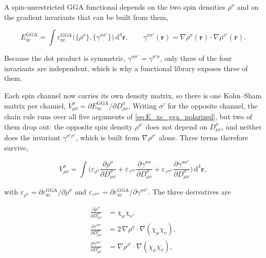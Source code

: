 \documentclass{article}
\begin{document}
A spin-unrestricted GGA functional depends on the two spin densities
\( \rho^\sigma \) and on the gradient invariants that can be built from
them,

\begin{equation}
  E_\text{xc}^\text{GGA} = \int \varepsilon_\text{xc}^\text{GGA}
  \big( \{\rho^\sigma\}, \{\gamma^{\sigma \sigma'}\} \big)\, \mathrm
  d^3 \mathbf r,
  \qquad
  \gamma^{\sigma \sigma'}(\mathbf r) = \nabla\rho^\sigma(\mathbf r)
  \cdot \nabla\rho^{\sigma'}(\mathbf r).
  \label{eq:E_xc_gga_polarized}
\end{equation}

Because the dot product is symmetric, \( \gamma^{\sigma \sigma'} =
\gamma^{\sigma' \sigma} \), only three of the four invariants are
independent, which is why a functional library exposes three of them.

Each spin channel now carries its own density matrix, so there is one
Kohn--Sham matrix per channel,
\( V^{\sigma}_{\mu \nu} = \partial E_\text{xc}^\text{GGA} / \partial
D^{\sigma}_{\mu \nu} \). Writing \( \sigma' \) for the opposite
channel, the chain rule runs over all five arguments of
\eqref{eq:E_xc_gga_polarized}, but two of them drop out: the opposite
spin density \( \rho^{\sigma'} \) does not depend on
\( D^{\sigma}_{\mu \nu} \), and neither does the invariant
\( \gamma^{\sigma' \sigma'} \), which is built from
\( \nabla \rho^{\sigma'} \) alone. Three terms therefore survive,

\begin{equation}
  V^{\sigma}_{\mu \nu} = \int \bigg(
    \varepsilon_{\rho^\sigma}
    \frac{\partial \rho^\sigma}{\partial D^{\sigma}_{\mu \nu}}
    + \varepsilon_{\gamma^{\sigma \sigma}}
    \frac{\partial \gamma^{\sigma \sigma}}{\partial D^{\sigma}_{\mu \nu}}
    + \varepsilon_{\gamma^{\sigma \sigma'}}
    \frac{\partial \gamma^{\sigma \sigma'}}{\partial D^{\sigma}_{\mu \nu}}
  \bigg)\, \mathrm d^3 \mathbf r,
  \label{eq:V_xc_chain_polarized}
\end{equation}

with \( \varepsilon_{\rho^\sigma} = \partial
\varepsilon_\text{xc}^\text{GGA} / \partial \rho^\sigma \) and
\( \varepsilon_{\gamma^{\sigma \sigma'}} = \partial
\varepsilon_\text{xc}^\text{GGA} / \partial \gamma^{\sigma \sigma'} \).
The three derivatives are

\begin{align}
  \frac{\partial \rho^\sigma}{\partial D^{\sigma}_{\mu \nu}}
  &= \chi_\mu \chi_\nu, \\
  \frac{\partial \gamma^{\sigma \sigma}}{\partial D^{\sigma}_{\mu \nu}}
  &= 2\, \nabla\rho^\sigma \cdot \nabla(\chi_\mu \chi_\nu), \\
  \frac{\partial \gamma^{\sigma \sigma'}}{\partial D^{\sigma}_{\mu \nu}}
  &= \nabla\rho^{\sigma'} \cdot \nabla(\chi_\mu \chi_\nu),
  \label{eq:gamma_derivatives}
\end{align}
\end{document}
